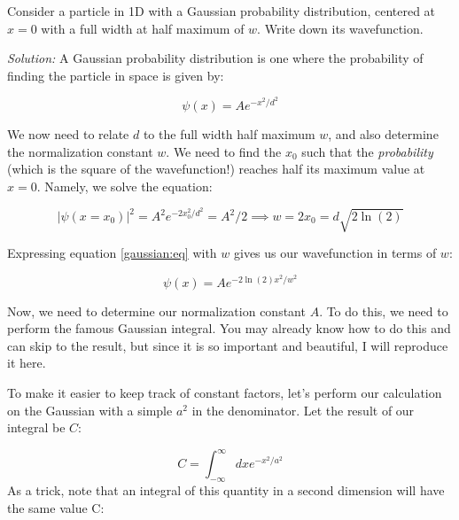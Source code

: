 \begin{example}
	Consider a particle in 1D with a Gaussian probability distribution, centered at $x = 0$ with a full width at half maximum of $ w $. Write down its wavefunction.
	
	\textit{Solution: } A Gaussian probability distribution is one where the probability of finding the particle in space is given by:
	
	\begin{equation} \label{gaussian:eq}
		\psi(x) = Ae^{-x^2/d^2}
	\end{equation}
	
	We now need to relate $d$ to the full width half maximum $w$, and also determine the normalization constant $ w $. We need to find the $x_0$ such that the \textit{probability} (which is the square of the wavefunction!) reaches half its maximum value at $x = 0$. Namely, we solve the equation:
	
	\begin{equation}
		|\psi(x = x_0)|^2 = A^2 e^{-2x_0^2/d^2} = A^2/2 \implies w = 2x_0 = d\sqrt{2\ln(2)}
	\end{equation}
	
	Expressing equation \ref{gaussian:eq} with $w$ gives us our wavefunction in terms of $w$:
	
	\begin{equation}
		\psi(x) = Ae^{-2\ln(2) x^2/w^2}
	\end{equation}
	
	Now, we need to determine our normalization constant $A$. To do this, we need to perform the famous Gaussian integral. You may already know how to do this and can skip to the result, but since it is so important and beautiful, I will reproduce it here. 
	
	To make it easier to keep track of constant factors, let's perform our calculation on the Gaussian with a simple $a^2$ in the denominator. Let the result of our integral be $C$:
	
	\begin{equation}
		C = \int_{-\infty}^{\infty}dx e^{-x^2/a^2}
	\end{equation}
	As a trick, note that an integral of this quantity in a second dimension will have the same value C:
	

\end{example}
